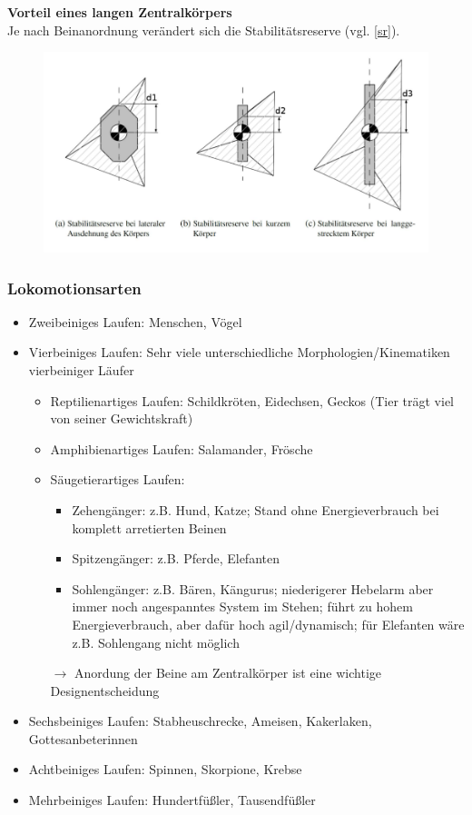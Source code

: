 \textbf{Vorteil eines langen Zentralkörpers}\\
Je nach Beinanordnung verändert sich die Stabilitätsreserve (vgl. \autoref{sr}).
\begin{figure}
	\centering	
	\includegraphics[width=\textwidth]{figures/zentralkoerper.png}
	\caption{}
	\label{sr}
\end{figure}
\subsubsection{Lokomotionsarten} %
\begin{itemize}
	\item Zweibeiniges Laufen: Menschen, Vögel
	\item Vierbeiniges Laufen: Sehr viele unterschiedliche Morphologien/Kinematiken vierbeiniger Läufer
	\begin{itemize}
		\item Reptilienartiges Laufen: Schildkröten, Eidechsen, Geckos (Tier trägt viel von seiner Gewichtskraft)
		\item Amphibienartiges Laufen: Salamander, Frösche
		\item Säugetierartiges Laufen:
		\begin{itemize}
			\item Zehengänger: z.B. Hund, Katze; Stand ohne Energieverbrauch bei komplett arretierten Beinen
			\item Spitzengänger: z.B. Pferde, Elefanten
			\item Sohlengänger: z.B. Bären, Kängurus; niederigerer Hebelarm aber immer noch angespanntes System im Stehen; führt zu hohem Energieverbrauch, aber dafür hoch agil/dynamisch; für 						  Elefanten wäre z.B. Sohlengang nicht möglich
		\end{itemize}
		\item[$\rightarrow$] Anordung der Beine am Zentralkörper ist eine wichtige Designentscheidung
	\end{itemize}
	\item Sechsbeiniges Laufen: Stabheuschrecke, Ameisen, Kakerlaken, Gottesanbeterinnen
	\item Achtbeiniges Laufen: Spinnen, Skorpione, Krebse
	\item Mehrbeiniges Laufen: Hundertfüßler, Tausendfüßler
\end{itemize}

